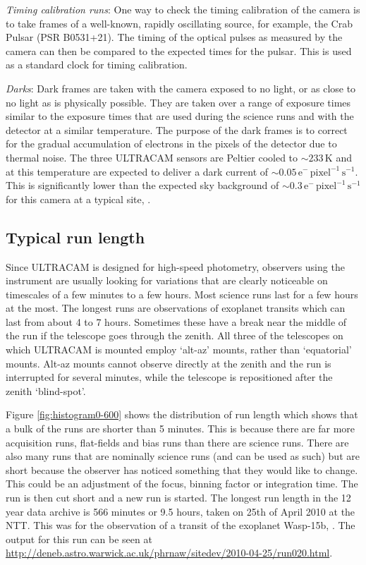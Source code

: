 \emph{Timing calibration runs}: One way to check the timing calibration of the camera is to take frames of a well-known, rapidly oscillating source, for example, the Crab Pulsar (PSR B0531+21). The timing of the optical pulses as measured by the camera can then be compared to the expected times for the pulsar. This is used as a standard clock for timing calibration.

\emph{Darks}: Dark frames are taken with the camera exposed to no light, or as close to no light as is physically possible. They are taken over a range of exposure times similar to the exposure times that are used during the science runs and with the detector at a similar temperature. The purpose of the dark frames is to correct for the gradual accumulation of electrons in the pixels of the detector due to thermal noise. The three ULTRACAM sensors are Peltier cooled to $\sim 233\,\mbox{K}$ and at this temperature are expected to deliver a dark current of $\sim0.05\,\mbox{e}^{-}\,\mbox{pixel}^{-1}\,\mbox{s}^{-1}$. This is significantly lower than the expected sky background of $\sim0.3\,\mbox{e}^{-}\,\mbox{pixel}^{-1}\,\mbox{s}^{-1}$ for this camera at a typical site, \citep{dhillon07}. 

\subsection{Typical run length}
Since ULTRACAM is designed for high-speed photometry, observers using the instrument are usually looking for variations that are clearly noticeable on timescales of a few minutes to a few hours. Most science runs last for a few hours at the most. The longest runs are observations of exoplanet transits which can last from about 4 to 7 hours. Sometimes these have a break near the middle of the run if the telescope goes through the zenith. All three of the telescopes on which ULTRACAM is mounted employ `alt-az' mounts, rather than `equatorial' mounts. Alt-az mounts cannot observe directly at the zenith and the run is interrupted for several minutes, while the telescope is repositioned after the zenith `blind-spot'.

Figure \ref{fig:histogram0-600} shows the distribution of run length which shows that a bulk of the runs are shorter than 5 minutes. This is because there are far more acquisition runs, flat-fields and bias runs than there are science runs. There are also many runs that are nominally science runs (and can be used as such) but are short because the observer has noticed something that they would like to change. This could be an adjustment of the focus, binning factor or integration time. The run is then cut short and a new run is started. The longest run length in the 12 year data archive is 566 minutes or 9.5 hours, taken on 25th of April 2010 at the NTT. This was for the observation of a transit of the exoplanet Wasp-15b, \citep{Wasp15b}. The output for this run can be seen at \url{http://deneb.astro.warwick.ac.uk/phrnaw/sitedev/2010-04-25/run020.html}. 

